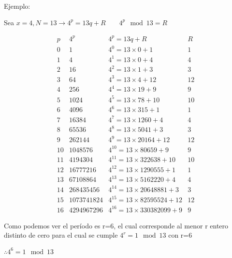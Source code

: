 Ejemplo:

 Sea $x = 4, N = 13 \rightarrow 4^p = 13 q + R \qquad 4^p \mod 13 = R$

 \[\begin{matrix}
         p  &   4^p & 4^p = 13 q                         + R    &   R   \\
         0  &   1   & 4^0 = 13\times0                    + 1    & 1     \\
         1  &   4   & 4^1 = 13\times0                    + 4    & 4     \\
         2  &   16  & 4^2 = 13\times1                    + 3    & 3     \\
         3  &   64  & 4^3 = 13\times4                    + 12   & 12    \\
         4  &   256  & 4^4 = 13\times19                  + 9    & 9     \\
         5  &   1024  & 4^5 = 13\times78                 + 10   & 10    \\ %
         6  &   4096  & 4^6 = 13\times315                + 1    & 1     \\
         7  &   16384  & 4^7 = 13\times1260              + 4    & 4     \\
         8  &   65536  & 4^8 = 13\times5041              + 3    & 3     \\
         9  &   262144  & 4^9 = 13\times20164            + 12   & 12    \\
         10 &   1048576  & 4^10 = 13\times80659          + 9    & 9     \\
         11 &   4194304  & 4^11 = 13\times322638         + 10   & 10    \\
         12 &   16777216  & 4^12 = 13\times1290555       + 1    & 1     \\
         13 &   67108864  & 4^13 = 13\times5162220       + 4    & 4     \\
         14 &   268435456  & 4^14 = 13\times20648881     + 3    & 3     \\
         15 &   1073741824  & 4^15 = 13\times82595524    + 12   & 12    \\
         16 &   4294967296  & 4^16 = 13\times330382099   + 9    & 9     
     \end{matrix}
 \]

 Como podemos ver el período es r=6, el cual corresponde al menor r entero distinto de cero para el cual se cumple $4^r=1 \mod 13$ con r=6

 $\therefore 4^6 = 1 \mod 13$

